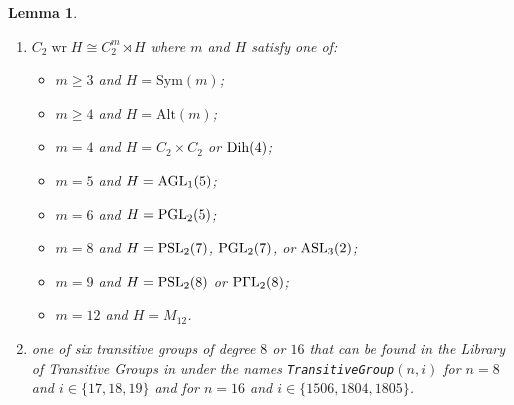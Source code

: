 \documentclass[a4paper]{amsart}
\newcommand{\Sym}{\mathrm{Sym}}
\newcommand{\Alt}{\mathrm{Alt}}
\renewcommand{\wr}{\mathop{\mathrm{wr}}}
\newcommand{\PGammaL}{\rm P\Gamma L}
\newcommand{\PGL}{\rm PGL}
\newcommand{\PSL}{\rm PSL}
\newcommand{\Dih}{\rm Dih}
\newcommand{\ASL}{\rm ASL}
\newcommand{\AGL}{\rm AGL}
\newtheorem{lemma}[theorem]{Lemma}
\theoremstyle{definition}
\begin{document}
\begin{lemma}
\begin{enumerate}[$(i)$]
\begin{itemize}
             \item $m=p+1$, $H=\PGL_2(p)$ and $S=\PSL_2(p)$, for $p\in\{5,7\}$.
          \end{itemize}
        \item $C_2 \wr H \cong C_2^m \rtimes H$ where $m$ and $H$ satisfy one of:
        \begin{itemize}
           \item $m\ge 3$ and $ H = \Sym(m)$;
           \item $m\ge 4$ and $ H = \Alt(m)$;
           \item $m=4$ and $H = C_2\times C_2$ or $\Dih(4)$;
           \item $m=5$ and $H=\AGL_1(5)$;
           \item $m=6$ and $H=\PGL_2(5)$;
           \item $m=8$ and $H=\PSL_2(7)$, $\PGL_2(7)$, or $\ASL_3(2)$;
           \item $m=9$ and $H=\PSL_2(8)$ or $\PGammaL_2(8)$;
           \item $m=12$ and $H=M_{12}$.
        \end{itemize}
       \item one of six transitive groups of degree $8$ or $16$ that
       can be found in the Library of Transitive Groups in \cite{magma} under the names {\tt TransitiveGroup}$(n,i)$ for $n=8$ and $i \in \{17,18,19\}$ and for
       $n=16$ and $i \in \{1506, 1804, 1805\}$.
    \end{enumerate}
\end{lemma} 
\end{document}
